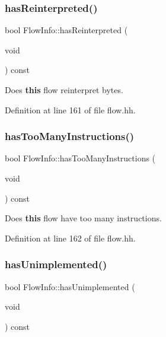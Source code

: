 \mbox{\label{class_flow_info_ab2747c50a51625710d9267ee9e87ec03}} 
\subsubsection{\texorpdfstring{hasReinterpreted()}{hasReinterpreted()}}
{\footnotesize\ttfamily bool Flow\+Info\+::has\+Reinterpreted (\begin{DoxyParamCaption}\item[{void}]{ }\end{DoxyParamCaption}) const\hspace{0.3cm}{\ttfamily [inline]}}



Does {\bfseries{this}} flow reinterpret bytes. 



Definition at line 161 of file flow.\+hh.

\mbox{\label{class_flow_info_aacc03c27e4386bab78565b58f8ec33c9}} 
\subsubsection{\texorpdfstring{hasTooManyInstructions()}{hasTooManyInstructions()}}
{\footnotesize\ttfamily bool Flow\+Info\+::has\+Too\+Many\+Instructions (\begin{DoxyParamCaption}\item[{void}]{ }\end{DoxyParamCaption}) const\hspace{0.3cm}{\ttfamily [inline]}}



Does {\bfseries{this}} flow have too many instructions. 



Definition at line 162 of file flow.\+hh.

\mbox{\label{class_flow_info_ab18097b31e5b59b13075742866790dde}} 
\subsubsection{\texorpdfstring{hasUnimplemented()}{hasUnimplemented()}}
{\footnotesize\ttfamily bool Flow\+Info\+::has\+Unimplemented (\begin{DoxyParamCaption}\item[{void}]{ }\end{DoxyParamCaption}) const\hspace{0.3cm}{\ttfamily [inline]}}




